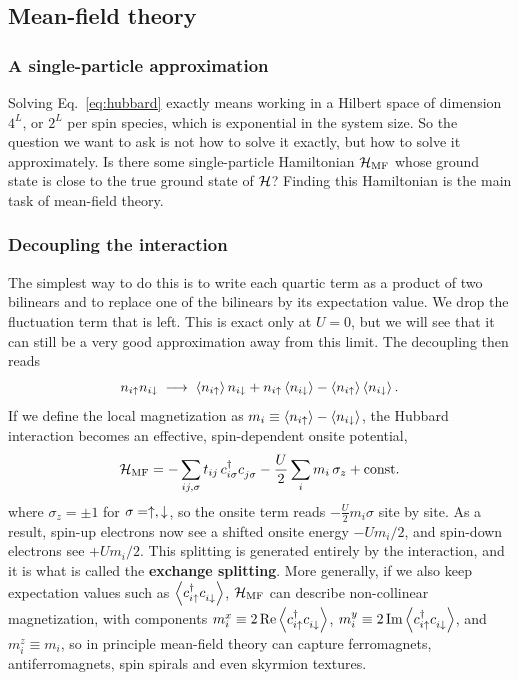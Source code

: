 \documentclass[lecture_notes.tex]{subfiles}
\begin{document}
\subsection{Mean-field theory}
\subsubsection{A single-particle approximation}
Solving Eq.~\eqref{eq:hubbard} exactly means working in a Hilbert space of dimension $4^L$, or
$2^L$ per spin species, which is exponential in the system size. So the question we want to ask
is not how to solve it exactly, but how to solve it approximately. Is there some single-particle
Hamiltonian $\mathcal{H}_{\mathrm{MF}}$ whose ground state is close to the true ground state of $\mathcal{H}$? Finding this
Hamiltonian is the main task of mean-field theory.

\subsubsection{Decoupling the interaction}
The simplest way to do this is to write each quartic term as a product of two bilinears and to
replace one of the bilinears by its expectation value. We drop the fluctuation term that is left.
This is exact only at $U=0$, but we will see that it can still be a very good approximation away
from this limit. The decoupling then reads
\begin{equation}
  n_{i\uparrow} n_{i\downarrow} \;\longrightarrow\; \expval{n_{i\uparrow}} n_{i\downarrow} + n_{i\uparrow}\expval{n_{i\downarrow}}
    - \expval{n_{i\uparrow}}\expval{n_{i\downarrow}}.
\end{equation}
If we define the local magnetization as $m_i \equiv \expval{n_{i\uparrow}} - \expval{n_{i\downarrow}}$, the
Hubbard interaction becomes an effective, spin-dependent onsite potential,
\begin{equation}
  \HMF = -\sum_{ij,\sigma} t_{ij}\,\cre{i\sigma}\ann{j\sigma}
    - \frac{U}{2}\sum_i m_i\, \sigma_z + \mathrm{const.}
  \label{eq:mfham}
\end{equation}
where $\sigma_z=\pm1$ for $\sigma=\uparrow,\downarrow$, so the onsite term reads $-\tfrac U2 m_i\sigma$ site by
site. As a result, spin-up electrons now see a shifted onsite energy $-Um_i/2$, and spin-down
electrons see $+Um_i/2$. This splitting is generated entirely by the interaction, and it is what
is called the \textbf{exchange splitting}. More generally, if we also keep expectation values such
as $\expval{\cre{i\up}\ann{i\dn}}$, $\mathcal{H}_{\mathrm{MF}}$ can describe non-collinear magnetization, with
components $m_i^x \equiv 2\Re\expval{\cre{i\up}\ann{i\dn}}$, $m_i^y \equiv
2\Im\expval{\cre{i\up}\ann{i\dn}}$, and $m_i^z\equiv m_i$, so in principle mean-field theory can
capture ferromagnets, antiferromagnets, spin spirals and even skyrmion textures.
\end{document}
